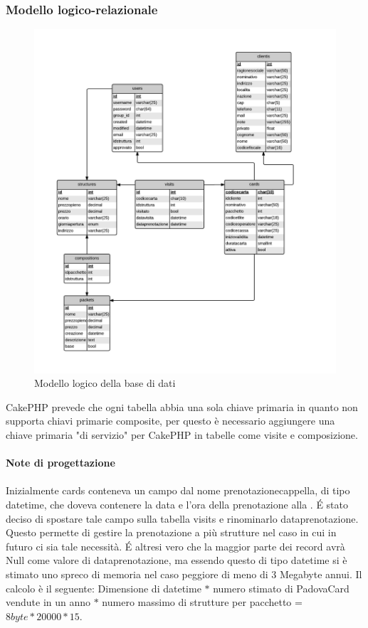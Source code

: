 \subsubsection{Modello logico-relazionale}\label{logicorelazionale}

\begin{figure}[H]
\centering
\includegraphics[width=1\textwidth]{images/logico.png}
\caption{Modello logico della base di dati}
\end{figure}
CakePHP prevede che ogni tabella abbia una sola chiave primaria in quanto non supporta chiavi primarie composite, per questo è necessario aggiungere una chiave primaria "di servizio" per CakePHP in tabelle come visite e composizione.\\ \\
\textbf{Note di progettazione}\\ \\
Inizialmente cards conteneva un campo dal nome prenotazionecappella, di tipo datetime, che doveva contenere la data e l'ora della prenotazione alla \cappella. \'E stato deciso di spostare tale campo sulla tabella visits e rinominarlo dataprenotazione. Questo permette di gestire la prenotazione a più strutture nel caso in cui in futuro ci sia tale necessità. \'E altresi vero che la maggior parte dei record avrà Null come valore di dataprenotazione, ma essendo questo di tipo datetime si è stimato uno spreco di memoria nel caso peggiore di meno di 3 Megabyte annui. Il calcolo è il seguente:
Dimensione di datetime $*$ numero stimato di PadovaCard vendute in un anno $*$ numero massimo di strutture per pacchetto = $8byte*20000*15 $. \\


